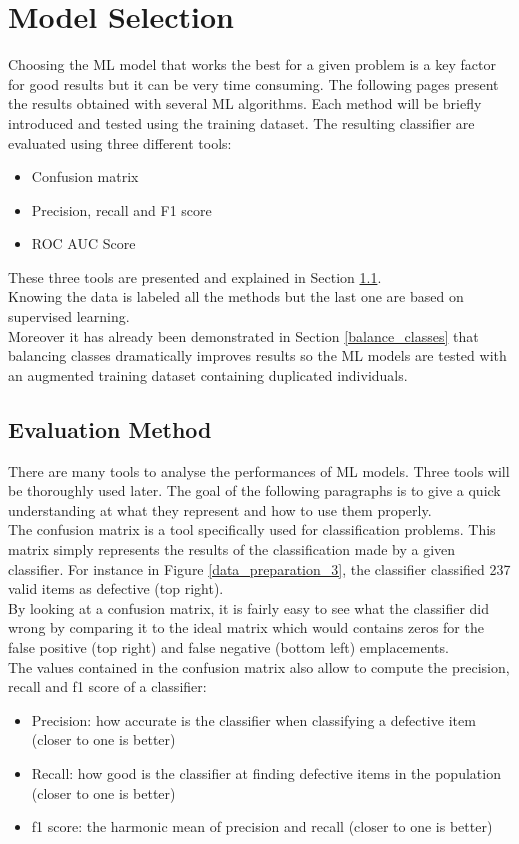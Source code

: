 \section{Model Selection}
Choosing the ML model that works the best for a given problem is a key factor
for good results but it can be very time consuming. The following pages present
the results obtained with several ML algorithms. Each method will be briefly
introduced and tested using the training dataset. The resulting classifier are
evaluated
using three different tools:
\begin{itemize}
    \item Confusion matrix
    \item Precision, recall and F1 score
    \item ROC AUC Score
\end{itemize}
These three tools are presented and explained in Section \ref{eval}.\\
Knowing the data is labeled all the methods but the last one are based on
supervised learning.\\
Moreover it has already been demonstrated in Section \ref{balance_classes} that
balancing classes dramatically improves results so the ML models are tested
with an augmented training dataset containing duplicated individuals.

\subsection{Evaluation Method}
\label{eval}
There are many tools to analyse the performances of ML models. Three tools will
be thoroughly used later. The goal of the following paragraphs is to give a
quick understanding at what they represent and how to use them properly.\\

The confusion matrix is a tool specifically used for classification problems.
This matrix simply represents the results of the classification made by a given
classifier. For instance in Figure \ref{data_preparation_3}, the classifier
classified 237 valid items as defective (top right).\\
By looking at a confusion matrix, it is fairly easy to see what the classifier
did wrong by comparing it to the ideal matrix which would contains zeros for
the false positive (top right) and false negative (bottom left) emplacements.\\

The values contained in the confusion matrix also allow to compute the
precision, recall and f1 score of a classifier:
\begin{itemize}
    \item Precision: how accurate is the classifier when classifying a
          defective item (closer to one is better)
    \item Recall: how good is the classifier at finding defective items in the
          population (closer to one is better)
    \item f1 score: the harmonic mean of precision and recall (closer to one is
          better)
\end{itemize}

